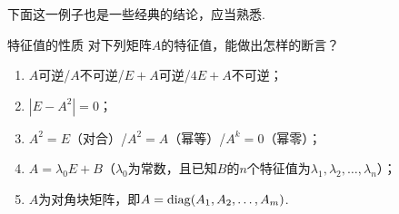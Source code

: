 下面这一例子也是一些经典的结论，应当熟悉.
\begin{example}{}{特征值的性质}
    对下列矩阵$A$的特征值，能做出怎样的断言？
    \begin{enumerate}
        \item $A$可逆/$A$不可逆/$E+A$可逆/$4E+A$不可逆；

        \item $|E-A^2|=0$；

        \item $A^2=E$（对合）/$A^2=A$（幂等）/$A^k=0$（幂零）；

        \item $A=\lambda_0E+B$（$\lambda_0$为常数，且已知$B$的$n$个特征值为$\lambda_1,\lambda_2,\ldots,\lambda_n$）；

        \item $A$为对角块矩阵，即$A=\operatorname{diag}(A_1,A_2,\ldots,A_m)$.
    \end{enumerate}
\end{example}

